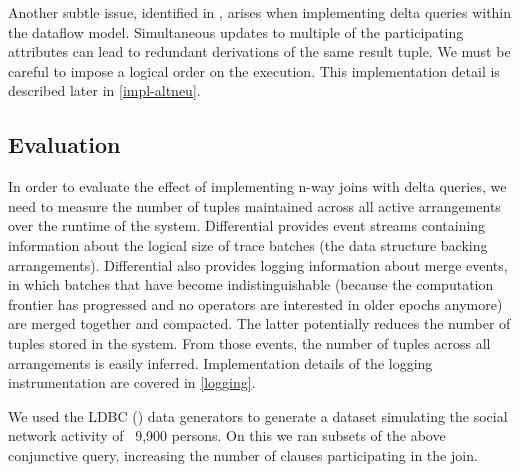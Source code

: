 \documentclass[../catalog.tex]{subfiles}
\begin{document}
Another subtle issue, identified in \cite{dogsdogsdogs}, arises when
implementing delta queries within the dataflow model. Simultaneous
updates to multiple of the participating attributes can lead to
redundant derivations of the same result tuple. We must be careful to
impose a logical order on the execution. This implementation detail is
described later in \autoref{impl-altneu}.

\subsection{Evaluation}

In order to evaluate the effect of implementing n-way joins with delta
queries, we need to measure the number of tuples maintained across all
active arrangements over the runtime of the system. Differential
provides event streams containing information about the logical size
of trace batches (the data structure backing
arrangements). Differential also provides logging information about
merge events, in which batches that have become indistinguishable
(because the computation frontier has progressed and no operators are
interested in older epochs anymore) are merged together and
compacted. The latter potentially reduces the number of tuples stored
in the system. From those events, the number of tuples across all
arrangements is easily inferred. Implementation details of the logging
instrumentation are covered in \autoref{logging}.

We used the LDBC (\cite{erling2015ldbc}) data generators to generate a
dataset simulating the social network activity of ~9,900 persons. On
this we ran subsets of the above conjunctive query, increasing the
number of clauses participating in the join.
\end{document}

